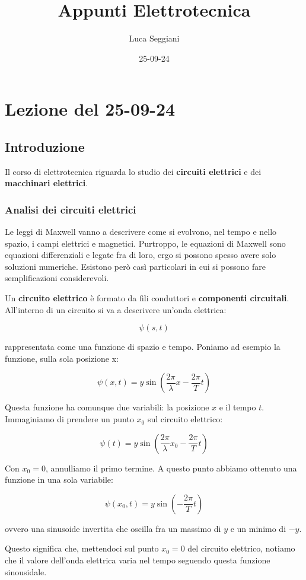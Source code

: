 \documentclass[a4paper,14pt]{memoir}
\title{Appunti Elettrotecnica}
\author{Luca Seggiani}
\date{25-09-24}
\begin{document}
\section{Lezione del 25-09-24}

\thispagestyle{empty}
\pagestyle{fancy}

\subsection{Introduzione}
Il corso di elettrotecnica riguarda lo studio dei \textbf{circuiti elettrici} e dei \textbf{macchinari elettrici}.

\subsubsection{Analisi dei circuiti elettrici}

Le leggi di Maxwell vanno a descrivere come si evolvono, nel tempo e nello spazio, i campi elettrici e magnetici.
Purtroppo,  le equazioni di Maxwell sono equazioni differenziali e legate fra di loro, ergo si possono spesso avere solo soluzioni numeriche.
Esistono però casì particolari in cui si possono fare semplificazioni considerevoli.

Un \textbf{circuito elettrico} è formato da fili conduttori e \textbf{componenti circuitali}.
All'interno di un circuito si va a descrivere un'onda elettrica:

$$
	\psi(s,t)
$$

rappresentata come una funzione di spazio e tempo.
Poniamo ad esempio la funzione, sulla sola posizione x:

$$
	\psi(x, t) = y \sin{\left( \frac{2\pi}{\lambda}x - \frac{2\pi}{T} t \right)}
$$

Questa funzione ha comunque due variabili: la posizione $x$ e il tempo $t$.
Immaginiamo di prendere un punto $x_0$ sul circuito elettrico:

$$
	\psi(t) = y \sin{\left( \frac{2\pi}{\lambda}x_0 - \frac{2\pi}{T} t \right)}
$$

Con $x_0 = 0$, annulliamo il primo termine.
A questo punto abbiamo ottenuto una funzione in una sola variabile:

$$
\psi(x_0, t) = y \sin{\left( - \frac{2\pi}{T} t \right)}
$$

ovvero una sinusoide invertita che oscilla fra un massimo di $y$ e un minimo di $-y$.

Questo significa che, mettendoci sul punto $x_0 = 0$ del circuito elettrico, notiamo che il valore dell'onda elettrica varia nel tempo seguendo questa funzione sinousidale.
\end{document}
